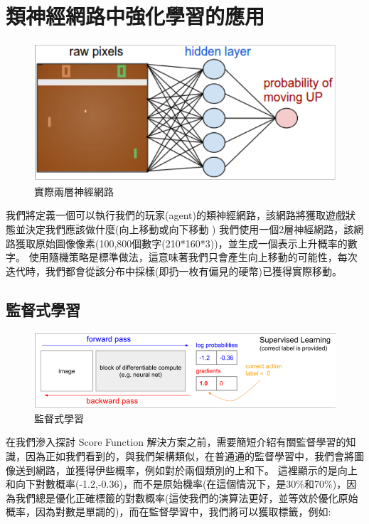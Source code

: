 \documentclass[14pt,a4paper]{report}  %
\begin{document}
\section{類神經網路中強化學習的應用}
\begin{figure}[hbt!]
\begin{center}
\includegraphics[scale=0.74]{ network}
\caption{實際兩層神經網路}
\end{center}

\end{figure}

 我們將定義一個可以執行我們的玩家(agent)的類神經網路，該網路將獲取遊戲狀態並決定我們應該做什麼(向上移動或向下移動
) 我們使用一個2層神經網路，該網路獲取原始圖像像素(100,800個數字(210*160*3))，並生成一個表示上升概率的數字。 使用隨機策略是標準做法，這意味著我們只會產生向上移動的可能性，每次迭代時，我們都會從該分布中採樣(即扔一枚有偏見的硬幣)已獲得實際移動。\\


\subsection{監督式學習}
\begin{figure}[hbt!]
\begin{center}
\includegraphics[scale=0.74]{supervising_learning}
\caption{監督式學習}
\end{center}
\end{figure}

 在我們滲入探討 Score Function 解決方案之前，需要簡短介紹有關監督學習的知識，因為正如我們看到的，與我們架構類似，在普通通的監督學習中，我們會將圖像送到網路，並獲得伊些概率，例如對於兩個類別的上和下。 這裡顯示的是向上和向下對數概率(-1.2,-0.36)，而不是原始機率(在這個情況下，是30$\%$和70$\%$)，因為我們總是優化正確標籤的對數概率(這使我們的演算法更好，並等效於優化原始概率，因為對數是單調的)，而在監督學習中，我們將可以獲取標籤，例如:\\
\end{document}
